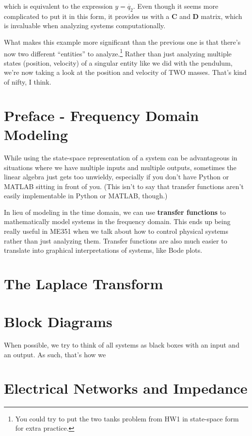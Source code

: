 \documentclass{report}
\begin{document}
\begin{onehalfspacing}
\begin{flushleft}
which is equivalent to the expression \(y = \dot{q_2}\). Even though it seems more complicated to put it in this form, it provides us with a \textbf{C} and \textbf{D} matrix, which is invaluable when analyzing systems computationally.

\medskip

What makes this example more significant than the previous one is that there's now two different ``entities'' to analyze.\footnote{You could try to put the two tanks problem from HW1 in state-space form for extra practice.} Rather than just analyzing multiple states (position, velocity) of a singular entity like we did with the pendulum, we're now taking a look at the position and velocity of TWO masses. That's kind of nifty, I think.

\section*{Preface - Frequency Domain Modeling}

While using the state-space representation of a system can be advantageous in situations where we have multiple inputs and multiple outputs, sometimes the linear algebra just gets too unwieldy, especially if you don't have Python or MATLAB sitting in front of you. (This isn't to say that transfer functions aren't easily implementable in Python or MATLAB, though.)

\medskip

In lieu of modeling in the time domain, we can use \textbf{transfer functions} to mathematically model systems in the frequency domain. This ends up being really useful in ME351 when we talk about how to control physical systems rather than just analyzing them. Transfer functions are also much easier to translate into graphical interpretations of systems, like Bode plots.

\section{The Laplace Transform}

\section{Block Diagrams}

When possible, we try to think of all systems as black boxes with an input and an output. As such, that's how we 

\section{Electrical Networks and Impedance}


\end{flushleft}
\end{onehalfspacing}
\end{document}
